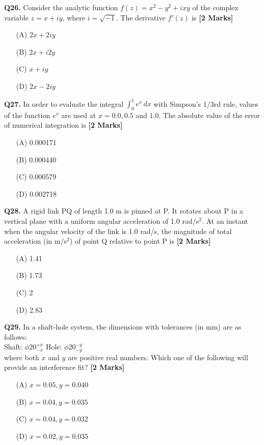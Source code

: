\documentclass[11pt]{article}
\newcommand{\questionb}[2]{
    \noindent\textbf{Q#2.} #1 \hfill \textbf{[2 Marks]}
}
\begin{document}
\questionb{Consider the analytic function \( f(z) = x^2 - y^2 + ixy \) of the complex variable \( z = x + iy \), where \( i = \sqrt{-1} \). The derivative \( f'(z) \) is}{26}
\begin{enumerate}
    \item[(A)] \( 2x + 2iy \)
    \item[(B)] \( 2x + i2y \)
    \item[(C)] \( x + iy \)
    \item[(D)] \( 2x - 2iy \)
\end{enumerate}
\vspace{0.5cm}

\questionb{In order to evaluate the integral \( \int_{0}^{1} e^x \, dx \) with Simpson’s 1/3rd rule, values of the function \( e^x \) are used at \( x = 0.0, 0.5 \) and \( 1.0 \). The absolute value of the error of numerical integration is}{27}
\begin{enumerate}
    \item[(A)] 0.000171
    \item[(B)] 0.000440
    \item[(C)] 0.000579
    \item[(D)] 0.002718
\end{enumerate}
\vspace{0.5cm}

\questionb{A rigid link PQ of length 1.0 m is pinned at P. It rotates about P in a vertical plane with a uniform angular acceleration of 1.0 rad/s\(^2\). At an instant when the angular velocity of the link is 1.0 rad/s, the magnitude of total acceleration (in m/s\(^2\)) of point Q relative to point P is}{28}
\begin{enumerate}
    \item[(A)] 1.41
    \item[(B)] 1.73
    \item[(C)] 2
    \item[(D)] 2.83
\end{enumerate}
\vspace{0.5cm}

\questionb{In a shaft-hole system, the dimensions with tolerances (in mm) are as follows: \\
Shaft: \( \phi 20^{+x}_{-x} \) \hspace{0.5cm} Hole: \( \phi 20^{-y}_{-y} \) \\
where both \( x \) and \( y \) are positive real numbers. Which one of the following will provide an interference fit?}{29}
\begin{enumerate}
    \item[(A)] \( x = 0.05, y = 0.040 \)
    \item[(B)] \( x = 0.04, y = 0.035 \)
    \item[(C)] \( x = 0.04, y = 0.032 \)
    \item[(D)] \( x = 0.02, y = 0.035 \)
\end{enumerate}
\vspace{0.5cm}
\end{document}
